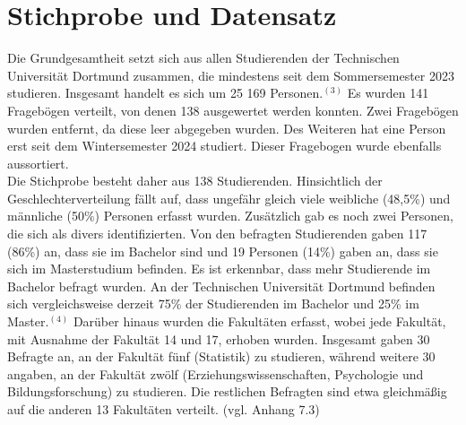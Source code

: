 \documentclass[11pt, a4paper]{article}
\begin{document}
\section{Stichprobe und Datensatz}
\label{Stichprobe und Datensatz}
Die Grundgesamtheit setzt sich aus allen Studierenden der Technischen Universität Dortmund zusammen, die mindestens seit dem Sommersemester 2023 studieren. Insgesamt handelt es sich um 25 169 Personen.\hyperref[seitenverweis]{$^{(3)}$} Es wurden 141 Fragebögen verteilt, von denen 138 ausgewertet werden konnten. Zwei Fragebögen wurden entfernt, da diese leer abgegeben wurden. Des Weiteren hat eine Person erst seit dem Wintersemester 2024 studiert. Dieser Fragebogen wurde ebenfalls aussortiert. \\
Die Stichprobe besteht daher aus 138 Studierenden. Hinsichtlich der Geschlechterverteilung fällt auf, dass ungefähr gleich viele weibliche (48,5\%) und männliche (50\%) Personen erfasst wurden. Zusätzlich gab es noch zwei Personen, die sich als divers identifizierten. Von den befragten Studierenden gaben 117 (86\%) an, dass sie im Bachelor sind und 19 Personen (14\%) gaben an, dass sie sich im Masterstudium befinden. Es ist erkennbar, dass mehr Studierende im Bachelor befragt wurden. An der Technischen Universität Dortmund befinden sich vergleichsweise derzeit 75\% der Studierenden im Bachelor und 25\% im Master.\hyperref[seitenverweis]{$^{(4)}$} Darüber hinaus wurden die Fakultäten erfasst, wobei jede Fakultät, mit Ausnahme der Fakultät 14 und 17, erhoben wurden. Insgesamt gaben 30 Befragte an, an der Fakultät fünf (Statistik) zu studieren, während weitere 30 angaben, an der Fakultät zwölf (Erziehungswissenschaften, Psychologie und Bildungsforschung) zu studieren. Die restlichen Befragten sind etwa gleichmäßig auf die anderen 13 Fakultäten verteilt. (vgl. Anhang 7.3)\\
\end{document}
